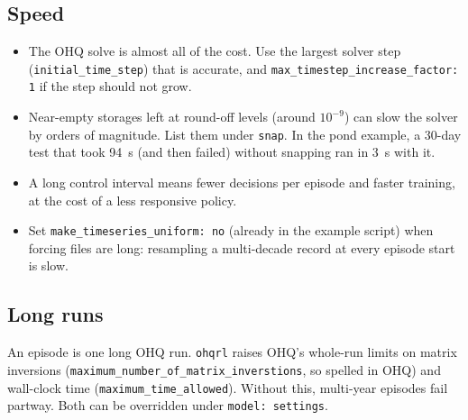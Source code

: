 \documentclass[11pt]{article}
\newcommand{\code}[1]{\texttt{#1}}
\begin{document}
\subsection{Speed}
\begin{itemize}
\item The OHQ solve is almost all of the cost. Use the largest solver step
  (\code{initial\_time\_step}) that is accurate, and
  \code{max\_timestep\_increase\_factor: 1} if the step should not grow.
\item Near-empty storages left at round-off levels (around $10^{-9}$) can
  slow the solver by orders of magnitude. List them under \code{snap}. In
  the pond example, a 30-day test that took 94~s (and then failed) without
  snapping ran in 3~s with it.
\item A long control interval means fewer decisions per episode and faster
  training, at the cost of a less responsive policy.
\item Set \code{make\_timeseries\_uniform: no} (already in the example
  script) when forcing files are long: resampling a multi-decade record at
  every episode start is slow.
\end{itemize}

\subsection{Long runs}
An episode is one long OHQ run. \code{ohqrl} raises OHQ's whole-run limits
on matrix inversions (\code{maximum\_number\_of\_matrix\_inverstions}, so
spelled in OHQ) and wall-clock time (\code{maximum\_time\_allowed}). Without
this, multi-year episodes fail partway. Both can be overridden under
\code{model: settings}.
\end{document}
